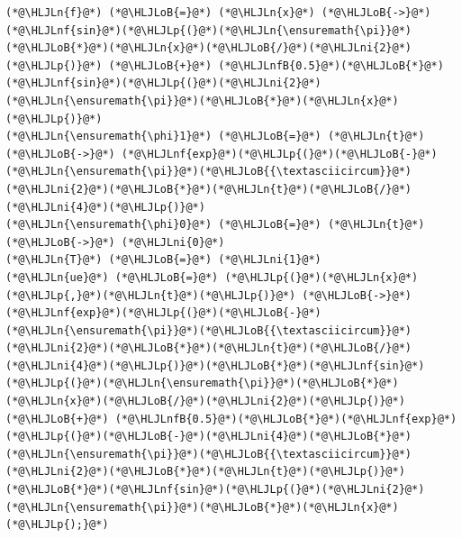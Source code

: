 \documentclass[12pt,a4paper]{article}
\newcommand{\HLJLn}[1]{#1}
\newcommand{\HLJLnf}[1]{\textcolor[RGB]{66,102,213}{#1}}
\newcommand{\HLJLnfB}[1]{\textcolor[RGB]{59,151,46}{#1}}
\newcommand{\HLJLni}[1]{\textcolor[RGB]{59,151,46}{#1}}
\newcommand{\HLJLoB}[1]{\textcolor[RGB]{102,102,102}{\textbf{#1}}}
\newcommand{\HLJLp}[1]{#1}
\begin{document}
\begin{lstlisting}
(*@\HLJLn{f}@*) (*@\HLJLoB{=}@*) (*@\HLJLn{x}@*) (*@\HLJLoB{->}@*) (*@\HLJLnf{sin}@*)(*@\HLJLp{(}@*)(*@\HLJLn{\ensuremath{\pi}}@*)(*@\HLJLoB{*}@*)(*@\HLJLn{x}@*)(*@\HLJLoB{/}@*)(*@\HLJLni{2}@*)(*@\HLJLp{)}@*) (*@\HLJLoB{+}@*) (*@\HLJLnfB{0.5}@*)(*@\HLJLoB{*}@*)(*@\HLJLnf{sin}@*)(*@\HLJLp{(}@*)(*@\HLJLni{2}@*)(*@\HLJLn{\ensuremath{\pi}}@*)(*@\HLJLoB{*}@*)(*@\HLJLn{x}@*)(*@\HLJLp{)}@*)
(*@\HLJLn{\ensuremath{\phi}1}@*) (*@\HLJLoB{=}@*) (*@\HLJLn{t}@*) (*@\HLJLoB{->}@*) (*@\HLJLnf{exp}@*)(*@\HLJLp{(}@*)(*@\HLJLoB{-}@*)(*@\HLJLn{\ensuremath{\pi}}@*)(*@\HLJLoB{{\textasciicircum}}@*)(*@\HLJLni{2}@*)(*@\HLJLoB{*}@*)(*@\HLJLn{t}@*)(*@\HLJLoB{/}@*)(*@\HLJLni{4}@*)(*@\HLJLp{)}@*)
(*@\HLJLn{\ensuremath{\phi}0}@*) (*@\HLJLoB{=}@*) (*@\HLJLn{t}@*) (*@\HLJLoB{->}@*) (*@\HLJLni{0}@*)
(*@\HLJLn{T}@*) (*@\HLJLoB{=}@*) (*@\HLJLni{1}@*)
(*@\HLJLn{ue}@*) (*@\HLJLoB{=}@*) (*@\HLJLp{(}@*)(*@\HLJLn{x}@*)(*@\HLJLp{,}@*)(*@\HLJLn{t}@*)(*@\HLJLp{)}@*) (*@\HLJLoB{->}@*) (*@\HLJLnf{exp}@*)(*@\HLJLp{(}@*)(*@\HLJLoB{-}@*)(*@\HLJLn{\ensuremath{\pi}}@*)(*@\HLJLoB{{\textasciicircum}}@*)(*@\HLJLni{2}@*)(*@\HLJLoB{*}@*)(*@\HLJLn{t}@*)(*@\HLJLoB{/}@*)(*@\HLJLni{4}@*)(*@\HLJLp{)}@*)(*@\HLJLoB{*}@*)(*@\HLJLnf{sin}@*)(*@\HLJLp{(}@*)(*@\HLJLn{\ensuremath{\pi}}@*)(*@\HLJLoB{*}@*)(*@\HLJLn{x}@*)(*@\HLJLoB{/}@*)(*@\HLJLni{2}@*)(*@\HLJLp{)}@*) (*@\HLJLoB{+}@*) (*@\HLJLnfB{0.5}@*)(*@\HLJLoB{*}@*)(*@\HLJLnf{exp}@*)(*@\HLJLp{(}@*)(*@\HLJLoB{-}@*)(*@\HLJLni{4}@*)(*@\HLJLoB{*}@*)(*@\HLJLn{\ensuremath{\pi}}@*)(*@\HLJLoB{{\textasciicircum}}@*)(*@\HLJLni{2}@*)(*@\HLJLoB{*}@*)(*@\HLJLn{t}@*)(*@\HLJLp{)}@*)(*@\HLJLoB{*}@*)(*@\HLJLnf{sin}@*)(*@\HLJLp{(}@*)(*@\HLJLni{2}@*)(*@\HLJLn{\ensuremath{\pi}}@*)(*@\HLJLoB{*}@*)(*@\HLJLn{x}@*)(*@\HLJLp{);}@*)
\end{lstlisting}
\end{document}

